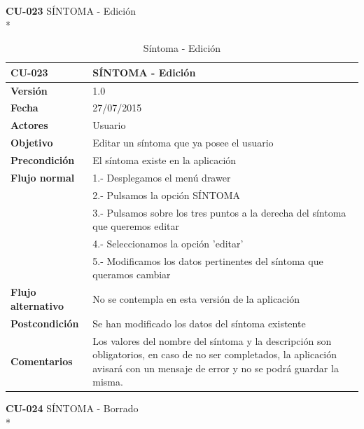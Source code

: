 \documentclass[../pfc.tex]{subfiles}
\begin{document}
	\clearpage
	
	\textbf{CU-023}	SÍNTOMA - Edición\\*
	
	\begin{table}[H]
		\centering
		\begin{tabular}[t]{|p{3cm}|p{9.5cm}|}
			\hline \textbf{CU-023} & \textbf{SÍNTOMA - Edición} \\*
			\hline\hline \textbf{Versión} & 1.0 \\*
			\hline\hline \textbf{Fecha} & 27/07/2015 \\*
			\hline\textbf{Actores} 	& Usuario\\*
			\hline \textbf{Objetivo} & Editar un síntoma que ya posee el usuario\\* 			
			\hline \textbf{Precondición} & El síntoma existe en la aplicación\\* 
			\hline \textbf{Flujo normal} & 1.- Desplegamos el menú drawer \\* 
			& 2.- Pulsamos la opción SÍNTOMA\\*	
			& 3.- Pulsamos sobre los tres puntos a la derecha del síntoma que queremos editar\\*	
			& 4.- Seleccionamos la opción 'editar'\\*	
			& 5.- Modificamos los datos pertinentes del síntoma que queramos cambiar\\*	
			\hline \textbf{Flujo alternativo} & No se contempla en esta versión de la aplicación\\*
			\hline \textbf{Postcondición} & Se han modificado los datos del síntoma existente\\* 
			\hline \textbf{Comentarios}   & Los valores del nombre del síntoma y la descripción son obligatorios, en caso de no ser completados, la aplicación avisará con un mensaje de error y no se podrá guardar la misma.\\*
			\hline
		\end{tabular}
		\caption{Síntoma - Edición}
		\label{tabla:caso023}
	\end{table}
	
	
	\textbf{CU-024}	SÍNTOMA - Borrado\\*
	
\end{document}
